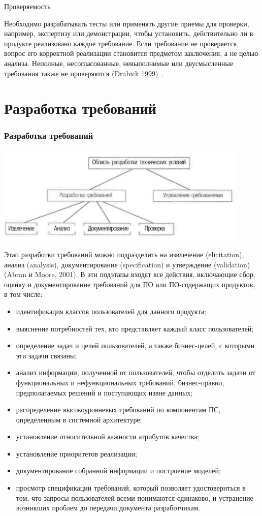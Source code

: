 \documentclass{../industrial-development}
\begin{document}
\alert{Проверяемость}

Необходимо разрабатывать тесты или применять другие приемы для проверки, например, экспертизу или демонстрации, чтобы
установить, действительно ли в продукте реализовано каждое требование. Если требование не проверяется, вопрос его корректной реализации становится предметом заключения, а не целью анализа. Неполные, несогласованные, невыполнимые или двусмысленные требования также не проверяются (Drabick 1999)~\cite[с.~24]{Wiegers}.


\section{Разработка требований}

\begin{frame} \frametitle{Разработка требований}
  \centerline{\includegraphics[width=0.9\textwidth]{pict3.pdf}}
\end{frame}

\lecturenotes

 Этап разработки требований можно подразделить на извлечение (elicitation), анализ (analysis), документирование (specification) и утверждение (validation) (Abran и Moore, 2001). В эти подэтапы входят все действия, включающие сбор, оценку и документирование требований для ПО
или ПО-содержащих продуктов, в том числе:
	\begin{itemize}
\item идентификация классов пользователей для данного продукта;
\item выяснение потребностей тех, кто представляет каждый класс пользователей;
\item определение задач и целей пользователей, а также бизнес-целей, с которыми эти задачи связаны;
\item анализ информации, полученной от пользователей, чтобы отделить задачи от функциональных и нефункциональных требований, бизнес-правил, предполагаемых решений и поступающих извне данных;
\item распределение высокоуровневых требований по компонентам ПС, определенным в системной архитектуре;
\item установление относительной важности атрибутов качества;
\item установление приоритетов реализации;
\item документирование собранной информации и построение моделей;
\item просмотр спецификации требований, который позволяет удостовериться в том, что запросы пользователей всеми понимаются одинаково, и устранение возникших проблем до передачи документа разработчикам.
\end{itemize}
\end{document}
